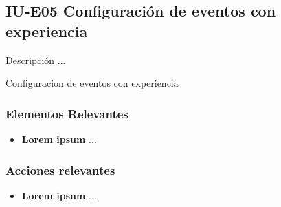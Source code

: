 
\subsection{IU-E05 Configuración de eventos con experiencia}

 Descripción ...

        {Configuracion de eventos con experiencia}

\subsubsection{Elementos Relevantes}

    \begin{itemize}
    \item {\bf Lorem ipsum}
        ...
    \end{itemize}

\subsubsection{Acciones relevantes}

    \begin{itemize}
    \item {\bf Lorem ipsum}
        ...
    \end{itemize}

\clearpage

